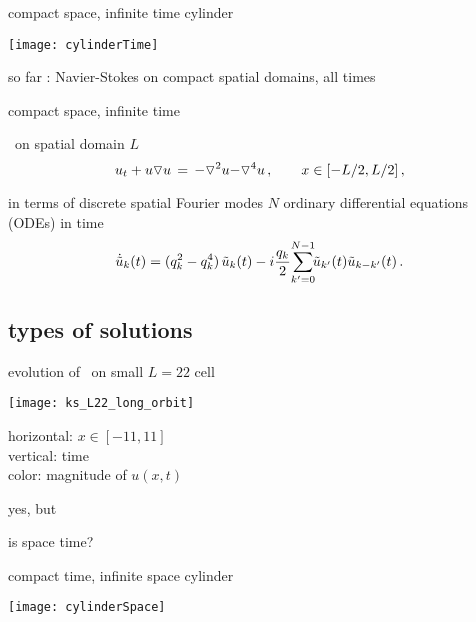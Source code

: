 \begin{frame}{compact space, infinite time cylinder}
\begin{center}
\texttt{[image: cylinderTime]}
\end{center}
so far : Navier-Stokes on compact spatial domains, all times
\end{frame}

\begin{frame}{compact space, infinite time}
\begin{block}{\KS\ on spatial domain $L$}
\[
  u_t + u \triangledown u \,=\,
    {\color{red}-}\triangledown^2 u {\color{red}-\triangledown^4 u}
    \,,\qquad   x \in [-L/2,L/2]
    \,,
\]
\end{block}


\begin{block}{in terms of discrete spatial Fourier modes}
$N$ ordinary differential equations (ODEs) in time
\[
\dot{\Fu}_k(\zeit) = ( q_k^2 - q_k^4 )\, \Fu_k(\zeit)
- i \frac{q_k}{2} \!\sum_{k'=0}^{N-1} \!\!\Fu_{k'}(\zeit) \Fu_{k-k'}(\zeit)
\,.
\]
\end{block}
\end{frame}


\subsection{types of solutions}
\begin{frame}{evolution of \KS\ on small $L=22$ cell}
\begin{center}
  \texttt{[image: ks\_L22\_long\_orbit]}
\end{center}
horizontal: $x \in [-11,11]$
\\
vertical: time
\\
color: magnitude of $u(x,t)$
\end{frame}

\begin{frame}{yes, but}
\begin{center}
{\huge is space time?}
\end{center}
\end{frame}

\begin{frame}{compact time, infinite space cylinder}
\begin{center}
\texttt{[image: cylinderSpace]}
\end{center}
\end{frame}

